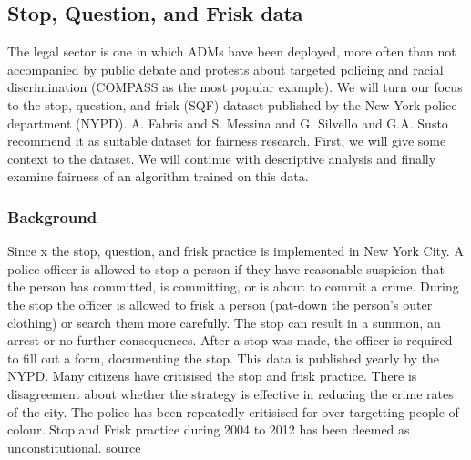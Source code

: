 \subsection*{Stop, Question, and Frisk data}

The legal sector is one in which ADMs have been deployed, more often than not accompanied by public debate and protests about targeted policing and racial discrimination (COMPASS as the most popular example). We will turn our focus to the stop, question, and frisk (SQF) dataset published by the New York police department (NYPD). A. Fabris and S. Messina and G. Silvello and G.A. Susto recommend it as suitable dataset for fairness research. First, we will give some context to the dataset. We will continue with descriptive analysis and finally examine fairness of an algorithm trained on this data.

\subsubsection*{Background}
Since x the stop, question, and frisk practice is implemented in New York City. A police officer is allowed to stop a person if they have reasonable suspicion that the person has committed, is committing, or is about to commit a crime.
During the stop the officer is allowed to frisk a person (pat-down the person's outer clothing) or search them more carefully.
The stop can result in a summon, an arrest or no further consequences. After a stop was made, the officer is required to fill out a form, documenting the stop. This data is published yearly by the NYPD.
Many citizens have critisised the stop and frisk practice. There is disagreement about whether the strategy is effective in reducing the crime rates of the city. The police has been repeatedly critisised for over-targetting people of colour.
Stop and Frisk practice during 2004 to 2012 has been deemed as unconstitutional. {\color{red} source}

